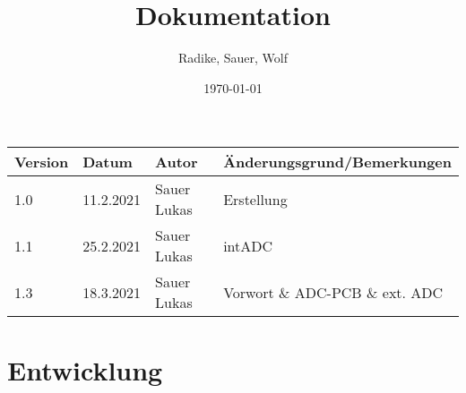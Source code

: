 \documentclass[a4paper,12pt]{article}
\begin{document}
\title{Dokumentation}
\author{Radike, Sauer, Wolf}
\date{\today}
\maketitle

\begin{tabular}[h]{l|l|l|l} %
	Version & Datum & Autor & Änderungsgrund/Bemerkungen\\
	\hline\hline
	1.0 & 11.2.2021 & Sauer Lukas & Erstellung\\
	\hline
	1.1 & 25.2.2021 & Sauer Lukas & intADC\\
	\hline
	1.3 & 18.3.2021 & Sauer Lukas &  Vorwort \& ADC-PCB \& ext. ADC\\
\end{tabular}
\newpage
\tableofcontents
\newpage


\section{Entwicklung}



\end{document}
